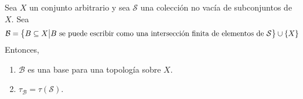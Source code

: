 \documentclass[12pt]{report}
\theoremstyle{largebreak}
\begin{document}
    \begin{propo}
        Sea $X$ un conjunto arbitrario y sea $\mathcal{S}$ una colección no vacía de subconjuntos de $X$. Sea 
        \begin{equation*}
            \mathcal{B}=\left\{B\subseteq X\big| B\textup{ se puede escribir como una intersección finita de elementos de }\mathcal{S} \right\}\cup\left\{X\right\}
        \end{equation*}
        Entonces, 
        \begin{enumerate}
            \item $\mathcal{B}$ es una base para una topología sobre $X$.
            \item $\tau_{\mathcal{B}}=\tau(\mathcal{S})$.
        \end{enumerate}
    \end{propo}
\end{document}
